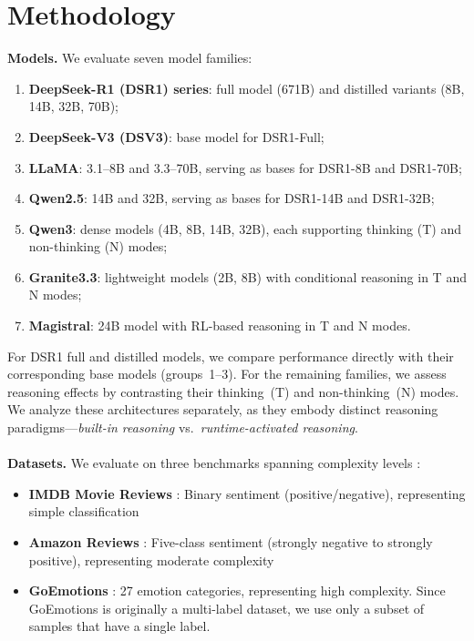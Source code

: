 \documentclass[runningheads]{llncs}
\begin{document}
\section{Methodology}

\textbf{Models.} We evaluate seven model families:
\begin{enumerate}[label=(\arabic*)]
    \item \textbf{DeepSeek-R1 (DSR1) series}: full model (671B) and distilled variants (8B, 14B, 32B, 70B);
    \item \textbf{DeepSeek-V3 (DSV3)}: base model for DSR1-Full;
    \item \textbf{LLaMA}: 3.1--8B and 3.3--70B, serving as bases for DSR1-8B and DSR1-70B;
    \item \textbf{Qwen2.5}: 14B and 32B, serving as bases for DSR1-14B and DSR1-32B;
    \item \textbf{Qwen3}: dense models (4B, 8B, 14B, 32B), each supporting thinking (T) and non-thinking (N) modes;
    \item \textbf{Granite3.3}: lightweight models (2B, 8B) with conditional reasoning in T and N modes;
    \item \textbf{Magistral}: 24B model with RL-based reasoning in T and N modes.
\end{enumerate}

For DSR1 full and distilled models, we compare performance directly with their corresponding base models (groups~1--3).
For the remaining families, we assess reasoning effects by contrasting their thinking~(T) and non-thinking~(N) modes.
We analyze these architectures separately, as they embody distinct reasoning paradigms—\emph{built-in reasoning} vs.\ \emph{runtime-activated reasoning}.
\\
\\
\textbf{Datasets.} We evaluate on three benchmarks spanning complexity levels \cite{huang2025explainable}:
\begin{itemize}[leftmargin=*,itemsep=1pt]
\item \textbf{IMDB Movie Reviews} \cite{steinke2022sentiment}: Binary sentiment (positive/negative), representing simple classification
\item \textbf{Amazon Reviews} \cite{mukherjee2019utilization}: Five-class sentiment (strongly negative to strongly positive), representing moderate complexity  
\item \textbf{GoEmotions} \cite{demszky2020goemotions}: 27 emotion categories, representing high complexity. Since GoEmotions is originally a multi-label dataset, we use only a subset of samples that have a single label.
\end{itemize}
\end{document}
